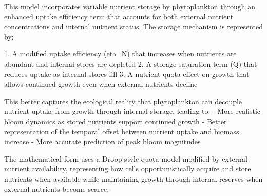 This model incorporates variable nutrient storage by phytoplankton through an enhanced uptake efficiency term that accounts for both external nutrient concentrations and internal nutrient status. The storage mechanism is represented by:

1. A modified uptake efficiency (eta_N) that increases when nutrients are abundant and internal stores are depleted
2. A storage saturation term (Q) that reduces uptake as internal stores fill
3. A nutrient quota effect on growth that allows continued growth even when external nutrients decline

This better captures the ecological reality that phytoplankton can decouple nutrient uptake from growth through internal storage, leading to:
- More realistic bloom dynamics as stored nutrients support continued growth
- Better representation of the temporal offset between nutrient uptake and biomass increase
- More accurate prediction of peak bloom magnitudes

The mathematical form uses a Droop-style quota model modified by external nutrient availability, representing how cells opportunistically acquire and store nutrients when available while maintaining growth through internal reserves when external nutrients become scarce.

